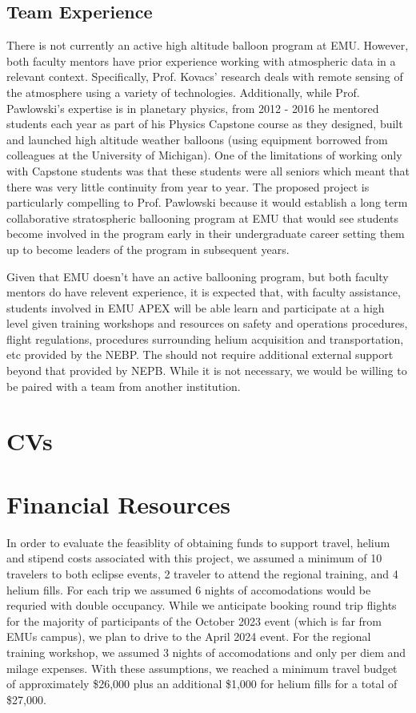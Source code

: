 \documentclass[12pt]{article}
\begin{document}
\subsection{Team Experience}
There is not currently an active high altitude balloon program at EMU. However, both faculty mentors have
prior experience working with atmospheric data in a relevant context. Specifically,
Prof. Kovacs' research deals with remote sensing of the atmosphere using a variety of technologies.
Additionally, while Prof. Pawlowski's expertise is in planetary physics, from 2012 - 2016 he
mentored students each year as part of his Physics
Capstone course as they designed, built and launched high altitude weather balloons (using
equipment borrowed from colleagues at the University of Michigan). One of the
limitations of working only with Capstone students
was that these students were all seniors which meant that there was very little continuity from year to year.
The proposed project is particularly compelling to Prof. Pawlowski
because it would establish a long term collaborative
stratospheric ballooning program at EMU that would see students become involved in the program
early in their undergraduate career setting them up to become leaders of the program in subsequent years.

Given that EMU doesn't have an active ballooning program, but both faculty mentors
do have relevent experience, it is expected that, with faculty assistance, students involved in EMU APEX will be able learn
and participate at a high level given training workshops and resources on safety and operations procedures, flight regulations,
procedures surrounding helium acquisition and transportation, etc provided by the NEBP.
The should not require additional external support beyond that provided by NEPB.
While it is not necessary, we would be willing to be paired with a team from
another institution.



\newpage
\section{CVs}



\newpage

\section{Financial Resources}
In order to evaluate the feasiblity of obtaining funds to support travel,
helium and stipend costs associated with this project, we
assumed a minimum of 10 travelers to both eclipse events, 2 traveler
to attend the regional training, and 4 helium fills. For
each trip we assumed 6 nights of accomodations would be requried with
double occupancy. While we anticipate booking round trip flights for the majority
of participants of the
October 2023 event (which is far from EMUs campus), we plan
to drive to the April 2024 event. For the regional training workshop,
we assumed 3 nights of accomodations and only per diem and milage expenses.
With these assumptions, we reached a minimum travel budget of approximately \$26,000
plus an additional \$1,000 for helium fills for a total of \$27,000.
\end{document}
